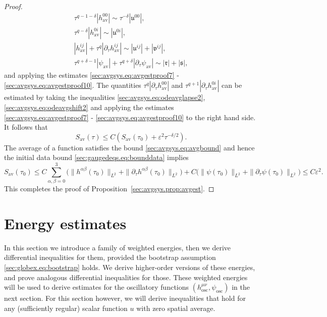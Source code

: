 \documentclass{article}
\newcommand{\osc}{\mathrm{osc}}
\newcommand{\av}{\mathrm{av}}
\newcommand{\mf}{\mathfrak}
\newcommand{\ve}{\varepsilon}
\newcommand{\pa}{\partial}
\begin{document}
\begin{proof}
\begin{subequations}
        \begin{gather}
            \tau^{q-1-\delta}| h_{\av}^{00}| \sim \tau^{-\delta}|\mf{u}^{00}|,\\
            \tau^{q-\delta}|h_{\av}^{0i}| \sim |\mf{u}^{0i}|,\\
            |h_{\av}^{ij}| + \tau^q|\pa_\tau h_{\av}^{ij}| \sim |\mf{u}^{ij}| + |\mf{v}^{ij}|,\\
            \tau^{q+\delta-1}|\psi_{\av}| + \tau^{q+\delta}|\pa_\tau \psi_{\av}|  \sim  |\mf{r}| + |\mf{s}|,
        \end{gather}
    \end{subequations}
    and applying the estimates \eqref{sec:avgsys.eq:avgestproof7} - \eqref{sec:avgsys.eq:avgestproof10}. The quantities $\tau^q |\pa_\tau h_{\av}^{00}|$ and $\tau^{q+1}|\pa_\tau h_{\av}^{0i}|$ can be estimated by taking the inequalities \eqref{sec:avgsys.eq:odeavglapse2}, \eqref{sec:avgsys.eq:odeavgshift2} and applying the estimates \eqref{sec:avgsys.eq:avgestproof7} - \eqref{sec:avgsys.eq:avgestproof10} to the right hand side. It follows that
    \begin{equation}
        S_{\av}(\tau) \leq C(S_{\av}(\tau_0) + \ve^2\tau^{-\delta/2}).
    \end{equation}
    The average of a function satisfies the bound \eqref{sec:avgsys.eq:avgbound} and hence the initial data bound \eqref{sec:gaugedeqs.eq:bounddata} implies
    \begin{equation}
        S_{\av}(\tau_0) \leq C\sum_{\alpha,\beta=0}^3\Big(\|h^{\alpha\beta}(\tau_0)\|_{L^2} + \|\pa_\tau h^{\alpha\beta}(\tau_0)\|_{L^2}\Big) + C\big(\|\psi(\tau_0)\|_{L^2} + \|\pa_\tau \psi(\tau_0)\|_{L^2}\big) \leq C\ve^2.
    \end{equation}
    This completes the proof of Proposition~\ref{sec:avgsys.prop:avgest}.
\end{proof}
\section{Energy estimates}\label{sec:energyests}
In this section we introduce a family of weighted energies, then we derive differential inequalities for them, provided the bootstrap assumption \eqref{sec:globex.eq:bootstrap} holds. We derive higher-order versions of these energies, and prove analogous differential inequalities for those. These weighted energies will be used to derive estimates for the oscillatory functions $(h_{\osc}^{\mu\nu},\psi_{\osc})$ in the next section. For this section however, we will derive inequalities that hold for any (sufficiently regular) scalar function $u$ with zero spatial average.
\end{document}
